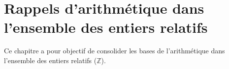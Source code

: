 \documentclass[11pt, a4paper]{report}
\begin{document}
\setcounter{chapter}{2} 

\chapter{Rappels d'arithmétique dans l’ensemble des entiers relatifs}

Ce chapitre a pour objectif de consolider les bases de l'arithmétique dans l'ensemble des entiers relatifs ($\mathbb{Z}$).








\end{document}
